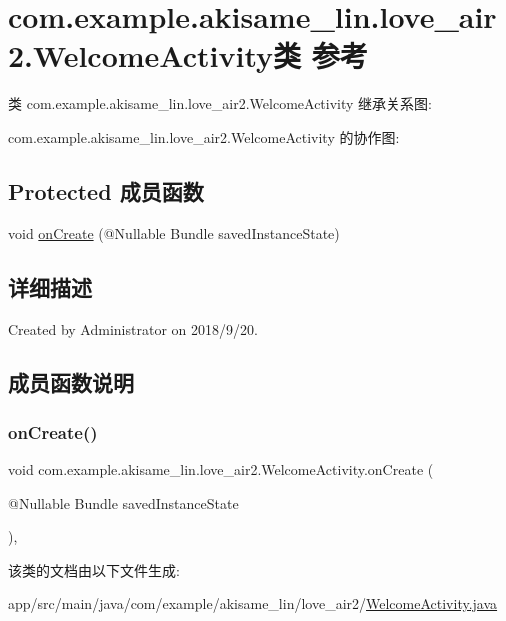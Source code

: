 \hypertarget{classcom_1_1example_1_1akisame__lin_1_1love__air2_1_1_welcome_activity}{}\section{com.\+example.\+akisame\+\_\+lin.\+love\+\_\+air2.\+Welcome\+Activity类 参考}
\label{classcom_1_1example_1_1akisame__lin_1_1love__air2_1_1_welcome_activity}


类 com.\+example.\+akisame\+\_\+lin.\+love\+\_\+air2.\+Welcome\+Activity 继承关系图\+:


com.\+example.\+akisame\+\_\+lin.\+love\+\_\+air2.\+Welcome\+Activity 的协作图\+:
\subsection*{Protected 成员函数}
\begin{DoxyCompactItemize}
\item 
void \mbox{\hyperlink{classcom_1_1example_1_1akisame__lin_1_1love__air2_1_1_welcome_activity_ad767aa853d409df8151e6bbcf9db7c96}{on\+Create}} (@Nullable Bundle saved\+Instance\+State)
\end{DoxyCompactItemize}


\subsection{详细描述}
Created by Administrator on 2018/9/20. 

\subsection{成员函数说明}
\mbox{\label{classcom_1_1example_1_1akisame__lin_1_1love__air2_1_1_welcome_activity_ad767aa853d409df8151e6bbcf9db7c96}} 
\subsubsection{\texorpdfstring{onCreate()}{onCreate()}}
{\footnotesize\ttfamily void com.\+example.\+akisame\+\_\+lin.\+love\+\_\+air2.\+Welcome\+Activity.\+on\+Create (\begin{DoxyParamCaption}\item[{@Nullable Bundle}]{saved\+Instance\+State }\end{DoxyParamCaption})\hspace{0.3cm}{\ttfamily [inline]}, {\ttfamily [protected]}}



该类的文档由以下文件生成\+:\begin{DoxyCompactItemize}
\item 
app/src/main/java/com/example/akisame\+\_\+lin/love\+\_\+air2/\mbox{\hyperlink{_welcome_activity_8java}{Welcome\+Activity.\+java}}\end{DoxyCompactItemize}
